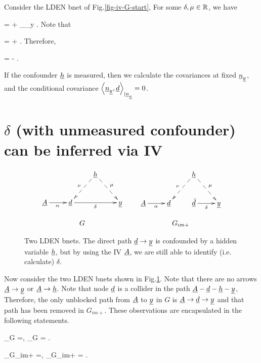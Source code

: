 Consider 
the LDEN bnet of Fig.\ref{fig-iv-G-start},
For some $\delta, \mu\in { \mathbb{R}}$, we have

\beq
\rvy = \delta \rvd +
\underbrace{ \mu \rvh + \rvu_\rvy}_{\rvn_y}
\;.
\eeq
Note that

\beq
\av{\rvy, \rvd} = \delta \av{\rvd, \rvd}
+ \av{\rvn_\rvy, \rvd}
\;.
\eeq
Therefore,

\beq
\delta =
-
\;.
\eeq  


If the confounder ${\underline{h}}$
is measured, then
we calculate 
the covariances at fixed ${\underline{n}}_{\underline{y}}$,
and 
the conditional covariance 
$\left\langle{\underline{n}}_{\underline{y}}, {\underline{d}}\right\rangle_{|{\underline{n}}_{\underline{y}}}=0$.

\section{$\delta$
(with unmeasured confounder)
can be
inferred via IV}



\begin{figure}[h!]
$$
\begin{array}{ccc}
\xymatrix{
&&\rvh\ar@{-->}[dl]_\nu\ar@{-->}[dr]^\mu
\\
\rvA\ar[r]_\alpha
&\rvd\ar[rr]_\delta
&&\rvy
}
&&
\xymatrix{
&&\rvh\ar@{-->}[dl]_\nu\ar@{-->}[dr]^\mu
\\
\rvA\ar[r]_\alpha
&\rvd&
\rvtd\ar[r]_\delta
&\rvy}
\\
\\
G&&G_{im+}
\end{array}
$$
\caption{
Two LDEN bnets. The direct path ${\underline{d}}\rightarrow{\underline{y}}$
is confounded by
a hidden variable ${\underline{h}}$, but
by using the IV ${\underline{A}}$, we are still
able to 
identify (i.e. calculate)
$\delta$.
}
\label{fig-iv-G-im}
\end{figure}

Now consider the two LDEN bnets 
shown in Fig.\ref{fig-iv-G-im}.
Note that there are no arrows
${\underline{A}}\rightarrow{\underline{y}}$
or 
${\underline{A}}\rightarrow{\underline{h}}$. Note that
node ${\underline{d}}$ is a collider
in the path 
${\underline{A}}-{\underline{d}}-{\underline{h}}-{\underline{y}}$, 
Therefore,
the only unblocked path
from ${\underline{A}}$ to 
${\underline{y}}$ in $G$ 
is ${\underline{A}}\rightarrow{\underline{d}}\rightarrow{\underline{y}}$
and that path has been
removed in $G_{im+}$. These
observations are 
encapsulated in the following statements.

\beq
\rvd\perp_{G} \rvy =, 
\;\; \rvA\perp_{G} \rvy= 
\;.
\eeq

\beq
\rvd\perp_{G_{im+}} \rvy =, 
\;\; \rvA\perp_{G_{im+}} \rvy= 
\;.
\eeq


